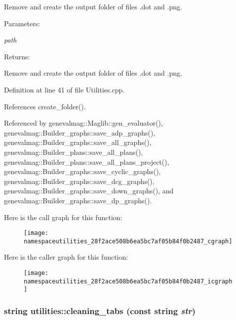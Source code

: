 Remove and create the output folder of files .dot and .png. \begin{Desc}
\item[Parameters:]
\begin{description}
\item[{\em path}]\end{description}
\end{Desc}
\begin{Desc}
\item[Returns:]\end{Desc}
Remove and create the output folder of files .dot and .png. 

Definition at line 41 of file Utilities.cpp.

References create\_\-folder().

Referenced by genevalmag::Maglib::gen\_\-evaluator(), genevalmag::Builder\_\-graphs::save\_\-adp\_\-graphs(), genevalmag::Builder\_\-graphs::save\_\-all\_\-graphs(), genevalmag::Builder\_\-plans::save\_\-all\_\-plans(), genevalmag::Builder\_\-plans::save\_\-all\_\-plans\_\-project(), genevalmag::Builder\_\-graphs::save\_\-cyclic\_\-graphs(), genevalmag::Builder\_\-graphs::save\_\-dcg\_\-graphs(), genevalmag::Builder\_\-graphs::save\_\-down\_\-graphs(), and genevalmag::Builder\_\-graphs::save\_\-dp\_\-graphs().

Here is the call graph for this function:\nopagebreak
\begin{figure}[H]
\begin{center}
\leavevmode
\texttt{[image: namespaceutilities\_28f2ace508b6ea5bc7af05b84f0b2487\_cgraph]}
\end{center}
\end{figure}


Here is the caller graph for this function:\nopagebreak
\begin{figure}[H]
\begin{center}
\leavevmode
\texttt{[image: namespaceutilities\_28f2ace508b6ea5bc7af05b84f0b2487\_icgraph]}
\end{center}
\end{figure}
\hypertarget{namespaceutilities_644dfdb507e47adf60e6984d28e080fd}{
\subsubsection[{cleaning\_\-tabs}]{\setlength{\rightskip}{0pt plus 5cm}string utilities::cleaning\_\-tabs (const string {\em str})}}
\label{namespaceutilities_644dfdb507e47adf60e6984d28e080fd}


